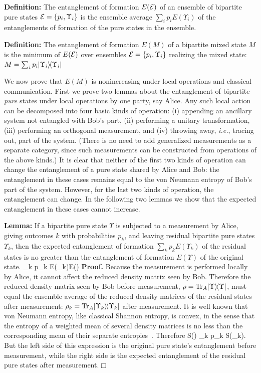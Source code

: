 {\bf Definition:} The entanglement of formation $E({\cal E})$ of an
ensemble of bipartite pure states ${\cal E}=\{p_i,\Upsilon_i\}$ is the
ensemble average $\sum_i p_i E(\Upsilon_i)$ of the entanglements of
formation of the pure states in the ensemble.
 
{\bf Definition:} The entanglement of formation $E(M)$ of a bipartite
mixed state $M$ is the minimum of $E(\cal E)$ over ensembles
${\cal E}=\{p_i, \Upsilon_i\}$ realizing the mixed state:
$M=\sum_i p_i | \Upsilon_i \rangle\! \langle \Upsilon_i |$
 
We now prove that $E(M)$ is nonincreasing under local operations and
classical communication.  First we prove two lemmas about the
entanglement of bipartite {\em pure} states under local operations by one
party, say Alice. Any such local action can be decomposed into
four basic kinds of operation: (i) appending an ancillary system
not entangled with Bob's part, (ii) performing a unitary transformation,
(iii) performing an orthogonal measurement, and (iv) throwing away,
{\em i.e.}, tracing out, part of the system.  (There is no need
to add generalized measurements as a separate category, since such
measurements can be constructed from operations of the above
kinds.)  It is clear that neither of the first two kinds of
operation can change the entanglement
of a pure state shared by Alice and Bob: the entanglement in
these cases remains equal to the von Neumann entropy of Bob's
part of the system.  However, for the last two kinds of operation,
the entanglement can change.  In the following two lemmas we
show that the expected entanglement in these cases cannot increase.
 
{\bf Lemma:} If a bipartite pure state $\Upsilon$ is subjected to a
measurement by Alice, giving outcomes $k$ with probabilities $p_k$,
and leaving residual bipartite pure states $\Upsilon_k$, then the
expected entanglement of formation $\sum_k p_k E(\Upsilon_k)$ of the
residual states is no greater than the entanglement of formation
$E(\Upsilon)$ of the original state.
\beq
\sum_k p_k E(\Upsilon_k)\leq E(\Upsilon)
\eeq
{\bf Proof.} Because the measurement is performed locally by Alice, it
cannot affect the reduced density matrix seen by Bob.  Therefore the
reduced density matrix seen by Bob before measurement,
$\rho={\rm Tr}_A| \Upsilon \rangle\! \langle \Upsilon |$, must equal the ensemble average of the
reduced density matrices of the residual states after measurement:
$\rho_k={\rm Tr}_A| \Upsilon_k \rangle\! \langle \Upsilon_k |$ after measurement.  It is well known
that von Neumann entropy, like classical Shannon entropy, is convex,
in the sense that the entropy of a weighted mean of several density
matrices is no less than the corresponding mean of their separate
entropies~\cite{Wehrl}.  Therefore
\beq
S(\rho) \geq \sum_k p_k S(\rho_k).
\eeq
But the left side of this expression is the original pure state's
entanglement before measurement, while the right side is the expected
entanglement of the residual pure states after measurement.\newline$\Box$
 

